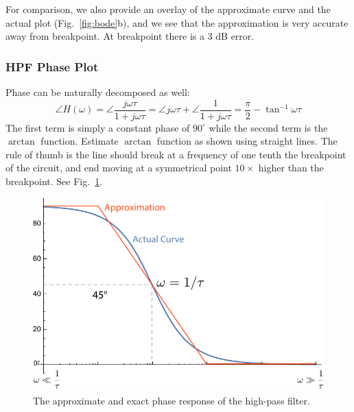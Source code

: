 For comparison, we also provide an overlay of the approximate curve and the actual plot (Fig.~\ref{fig:bode}b), and we see that the approximation is very accurate away from breakpoint.   At breakpoint there is a 3 dB error.



  
 



\subsubsection{HPF Phase Plot}

Phase can be naturally decomposed as well:
\begin{equation} \angle H(\omega ) =  \angle \frac{{j\omega \tau }}{{1 + j\omega \tau }} =  \angle j\omega \tau  +  \angle \frac{1}{{1 + j\omega \tau }} = \frac{\pi }{2} - {\tan ^{ - 1}}\omega \tau \end{equation}
The first term is simply a constant phase of $90^\circ$ while the second term is the $\arctan$ function.  Estimate $\arctan$ function as shown using straight lines.  The rule of thumb is the line should break at a frequency of one tenth the breakpoint of the circuit, and end moving at a symmetrical point $10\times$ higher than the breakpoint.  See Fig.~\ref{fig:bode_phase}.
 
\begin{figure}[tb]
\begin{center}
\includegraphics[width=.55\columnwidth]{mod1_3_12_bode4}
\end{center}
\caption{The approximate and exact phase response of the high-pass filter.} \label{fig:bode_phase}
\end{figure}







